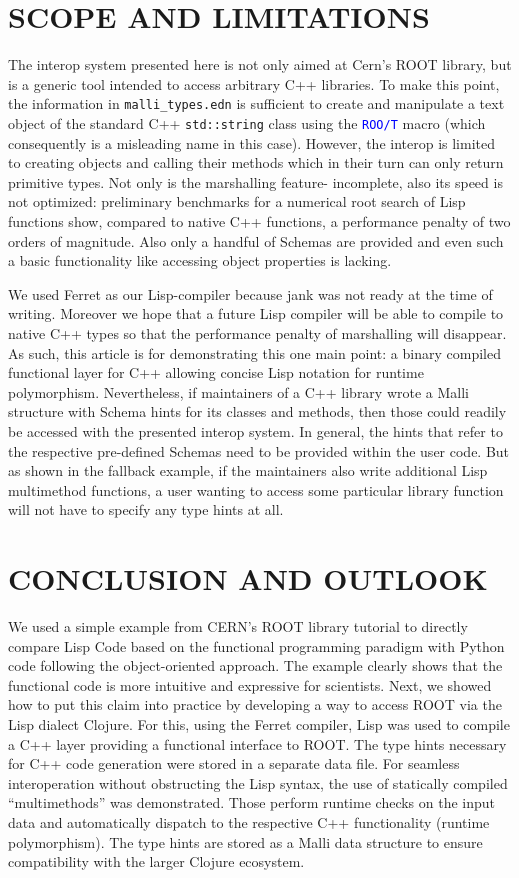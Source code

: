 \documentclass[twocolumn]{article}
\begin{document}
\section{SCOPE AND LIMITATIONS}
The interop system presented here is not only aimed at Cern’s ROOT library, but is a generic tool intended to access arbitrary C++ libraries. To make this point, the information in \texttt{malli\_types.edn} is sufficient to create and manipulate a text object of the standard C++ \texttt{std::string} class using the \texttt{\textcolor{blue}{ROO/T}} macro (which consequently is a misleading name in this case). However, the interop is limited to creating objects and calling their methods which in their turn can only return primitive types. Not only is the marshalling feature- incomplete, also its speed is not optimized: preliminary benchmarks for a numerical root search of Lisp functions show, compared to native C++ functions, a performance penalty of two orders of magnitude. Also only a handful of Schemas are provided and even such a basic functionality like accessing object properties is lacking.

We used Ferret as our Lisp-compiler because jank was not ready at the time of writing. Moreover we hope that a future Lisp compiler will be able to compile to native C++ types so that the performance penalty of marshalling will disappear. As such, this article is for demonstrating this one main point: a binary compiled functional layer for C++ allowing concise Lisp notation for runtime polymorphism. Nevertheless, if maintainers of a C++ library wrote a Malli structure with Schema hints for its classes and methods, then those could readily be accessed with the presented interop system. In general, the hints that refer to the respective pre-defined Schemas need to be provided within the user code. But as shown in the fallback example, if the maintainers also write additional Lisp multimethod functions, a user wanting to access some particular library function will not have to specify any type hints at all.

\section{CONCLUSION AND OUTLOOK}
We used a simple example from CERN's ROOT library tutorial to directly compare Lisp Code based on the functional programming paradigm with Python code following the object-oriented approach. The example clearly shows that the functional code is more intuitive and expressive for scientists. Next, we showed how to put this claim into practice by developing a way to access ROOT via the Lisp dialect Clojure. For this, using the Ferret compiler, Lisp was used to  compile a C++ layer providing a functional interface to ROOT. The type hints necessary for C++ code generation were stored in a separate data file. For seamless interoperation without obstructing the Lisp syntax, the use of statically compiled “multimethods” was demonstrated. Those perform runtime checks on the input data and automatically dispatch to the respective C++ functionality (runtime polymorphism). The type hints are stored as a Malli data structure to ensure compatibility with the larger Clojure ecosystem.
\end{document}
